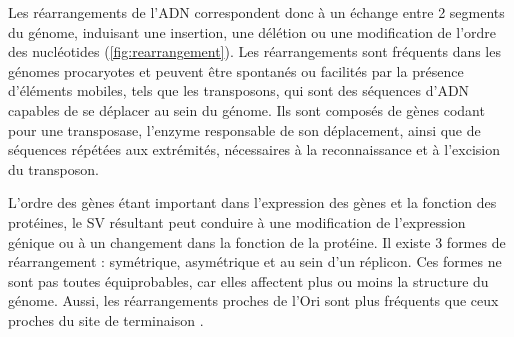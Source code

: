 Les réarrangements de l'ADN correspondent donc à un échange entre 2 segments du génome, induisant une insertion, une délétion ou une modification de l'ordre des nucléotides (\autoref{fig:rearrangement}). Les réarrangements sont fréquents dans les génomes procaryotes \cite{sun_genome-wide_2012} et peuvent être spontanés ou facilités par la présence d'éléments mobiles, tels que les transposons, qui sont des séquences d'ADN capables de se déplacer au sein du génome. Ils sont composés de gènes codant pour une transposase, l'enzyme responsable de son déplacement, ainsi que de séquences répétées aux extrémités, nécessaires à la reconnaissance et à l'excision du transposon. 

L'ordre des gènes étant important dans l'expression des gènes et la fonction des protéines, le SV résultant peut conduire à une modification de l'expression génique ou à un changement dans la fonction de la protéine. Il existe 3 formes de réarrangement : symétrique, asymétrique et au sein d'un réplicon. Ces formes ne sont pas toutes équiprobables, car elles affectent plus ou moins la structure du génome. Aussi, les réarrangements proches de l'Ori sont plus fréquents que ceux proches du site de terminaison \cite{darling_dynamics_2008}. 

